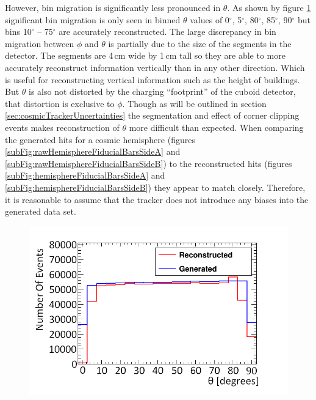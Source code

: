 However, bin migration is significantly less pronounced in $\theta$. As shown by figure \ref{fig:thetaGenVsRecoHem} significant bin migration is only seen in binned $\theta$ values of 0$^\circ$, 5$^\circ$, 80$^\circ$, 85$^\circ$, 90$^\circ$ but bins 10$^\circ$ -- 75$^\circ$ are accurately reconstructed. The large discrepancy in bin migration between $\phi$ and $\theta$ is partially due to the size of the segments in the detector. The segments are 4\,cm wide by 1\,cm tall so they are able to more accurately reconstruct information vertically than in any other direction. Which is useful for reconstructing vertical information such as the height of buildings. But $\theta$ is also not distorted by the charging ``footprint'' of the cuboid detector, that distortion is exclusive to $\phi$. Though as will be outlined in section \ref{sec:cosmicTrackerUncertainties} the segmentation and effect of corner clipping events makes reconstruction of $\theta$ more difficult than expected. When comparing the generated hits for a cosmic hemisphere (figures \ref{subFig:rawHemisphereFiducialBarsSideA} and \ref{subFig:rawHemisphereFiducialBarsSideB}) to the reconstructed hits (figures \ref{subFig:hemisphereFiducialBarsSideA} and \ref{subFig:hemisphereFiducialBarsSideB}) they appear to match closely. Therefore, it is reasonable to assume that the tracker does not introduce any biases into the generated data set.

\begin{figure}[!h]
 \centering
 \includegraphics[width=0.5\linewidth]{Chapter6/Figs/Raster/hemisphereThetaCompareMedText.png}
 \label{fig:thetaGenVsRecoHem}
\end{figure}

